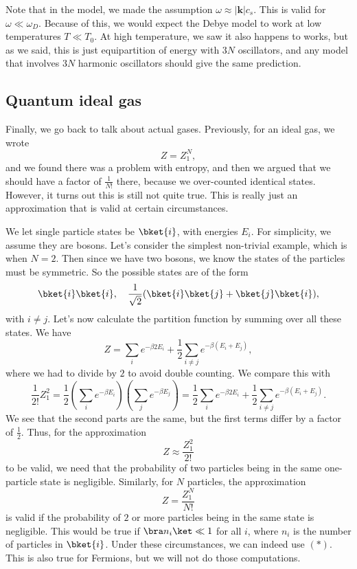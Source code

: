 \documentclass[a4paper]{article}
\begin{document}
Note that in the model, we made the assumption $\omega \approx |\mathbf{k}| c_s$. This is valid for $\omega \ll \omega_D$. Because of this, we would expect the Debye model to work at low temperatures $T \ll T_0$. At high temperature, we saw it also happens to works, but as we said, this is just equipartition of energy with $3N$ oscillators, and any model that involves $3N$ harmonic oscillators should give the same prediction.

\subsection{Quantum ideal gas}
Finally, we go back to talk about actual gases. Previously, for an ideal gas, we wrote
\[
  Z = Z_1^N,
\]
and we found there was a problem with entropy, and then we argued that we should have a factor of $\frac{1}{N!}$ there, because we over-counted identical states. However, it turns out this is still not quite true. This is really just an approximation that is valid at certain circumstances.

We let single particle states be $\bket{i}$, with energies $E_i$. For simplicity, we assume they are bosons. Let's consider the simplest non-trivial example, which is when $N = 2$. Then since we have two bosons, we know the states of the particles must be symmetric. So the possible states are of the form
\[
  \bket{i}\bket{i},\quad \frac{1}{\sqrt{2}} (\bket{i} \bket{j} + \bket{j} \bket{i}),
\]
with $i \not= j$. Let's now calculate the partition function by summing over all these states. We have
\[
  Z = \sum_i e^{-\beta 2 E_i} + \frac{1}{2}\sum_{i \not= j}e^{-\beta (E_i + E_j)},
\]
where we had to divide by $2$ to avoid double counting. We compare this with
\[
  \frac{1}{2!} Z_1^2 = \frac{1}{2} \left( \sum_i e^{-\beta E_i} \right)\left(\sum_j e^{-\beta E_j}\right) = \frac{1}{2} \sum_i e^{-\beta 2E_i} + \frac{1}{2} \sum_{i \not= j} e^{-\beta(E_i + E_j)}.
\]
We see that the second parts are the same, but the first terms differ by a factor of $\frac{1}{2}$. Thus, for the approximation
\[
  Z \approx \frac{Z_1^2}{2!}
\]
to be valid, we need that the probability of two particles being in the same one-particle state is negligible. Similarly, for $N$ particles, the approximation
\[
  Z = \frac{Z_1^N}{N!}\tag{$*$}
\]
is valid if the probability of $2$ or more particles being in the same state is negligible. This would be true if $\bra n_i\ket \ll 1$ for all $i$, where $n_i$ is the number of particles in $\bket{i}$. Under these circumstances, we can indeed use $(*)$. This is also true for Fermions, but we will not do those computations.
\end{document}

